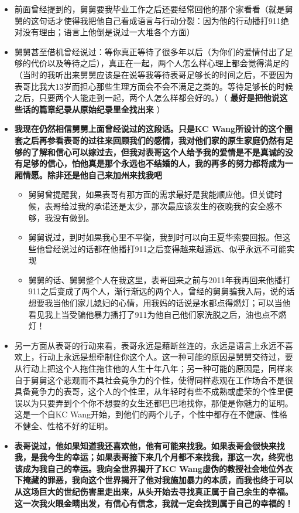 \documentclass[9pt, b5paper]{article}
\begin{document}
\begin{enumerate}
\begin{itemize}
\begin{itemize}
\item 前面曾经提到的，舅舅要我毕业工作之后还要经常回他的那个家看看（就是舅舅的这句话才使得我把他自己看成语言与行动分裂：因为他的行动播打911绝对没有理由；语言上他倒是说过一大堆各个方面）
\item 舅舅甚至借机曾经说过：等你真正等待了很多年以后（为你们的爱情付出了足够的代价以及等待之后），真正在一起，两个人怎么样心理上都会觉得满足的（当时的我听出来舅舅应该是在说等我等待表哥足够长的时间之后，不要因为表哥比我大13岁而担心那些生理方面会不会不满足之类的。等待足够长的时候之后，只要两个人能走到一起，两个人怎么样都会好的。）（ \textbf{最好是把他说这些话的篇章纪录从原始纪录里全找出来} ）
\item \textbf{我现在仍然相信舅舅上面曾经说过的这段话。只是KC Wang所设计的这个圈套之后再参看表哥的过往来回顾我们的感情，我对他们家的原生家庭仍然有足够的了解和信心可以嫁过去，但我对表哥这个人给予我的爱情是不是真诚的没有足够的信心，怕他真是那个永远也不结婚的人，我的再多的努力都将成为一厢情愿。除非还是他自己来加州来找我吧}
\begin{itemize}
\item 舅舅曾提醒我，如果表哥有那方面的需求最好是我能顺应他。但关键时候，表哥给过我的承诺还是太少，那次最应该发生的夜晚我的安全感不够，我没有做到。
\item 舅舅说过，到时如果我心里不平衡，我到时可以向王夏华索要回报。但这些他曾经说过的话都在他播打911之后变得越来越遥远、似乎永远不可能实现
\item 舅舅的话、舅舅整个人在我这里，表哥回来之前与2011年我再回来他播打911之后变成了两个人，渐行渐远的两个人，曾经的舅舅骗我入局，说的话想要我当他们家儿媳妇的心情，用我妈的话说是水都点得燃灯；可以当他看见我上当受骗他暴力播打了911为他自己他们家洗脱之后，油也点不燃灯！
\end{itemize}
\item 另一方面从表哥的行动来看，表哥永远是藉断丝连的，永远是语言上永远不喜欢上，行动上永远是想牵制住你这个人。这一种可能的原因是舅舅交待过，要从行动上把这个人拖住拖住他的人生十年八年；另一种可能的原因是，同样来自于舅舅这个悲观而不具社会竟争力的个性，使得同样悲观在工作场合不是很具备竟争力的表哥，这个人的个性里，从年轻时有些不成熟或虚荣的个性里便误以为只要弄到个个你不想要的女生还都巴巴地找你，那便是你魅力的证明。这是一个自KC Wang开始，到他们的两个儿子，个性中都存在不健康、性格不健全、性格不好的证明。
\item \textbf{表哥说过，他如果知道我还喜欢他，他有可能来找我。如果表哥会很快来找我，是我今生的幸运；如果表哥接下来几个月都不来找我，那这一次，终究也该成为我自己的幸运。我向全世界揭开了KC Wang虚伪的教授社会地位外衣下掩藏的罪恶，我向这个世界揭开了他对我施加暴力的本质，而我也终于可以从这场巨大的世纪伤害里走出来，从头开始去寻找真正属于自己余生的幸福。这一次我火眼金睛出发，有信心有信念，我就一定会找到属于自己的幸福的！}
\end{itemize}


\end{itemize}
\end{enumerate}
\end{document}
